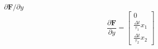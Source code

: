 \vspace{-0.45in}
\begin{block}{$\partial \mathbf{F} / \partial y$}
\begin{equation*}
\frac{\partial \mathbf{F}}{\partial y} = \begin{bmatrix}
0 \\[0.3cm]
\frac{\Delta t}{\tau_1} x_1 \\[0.3cm]
\frac{\Delta t}{\tau_2} x_2
\end{bmatrix}
\end{equation*}
\end{block}
